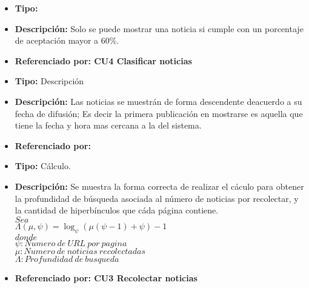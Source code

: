\begin{itemize}
  \item \textbf{Tipo:}  
  \item \textbf{Descripción:} Solo se puede mostrar una noticia si cumple con un porcentaje de aceptación mayor a 60\%.
  \item \textbf{Referenciado por: CU4 Clasificar noticias}  \\
\end{itemize}




\begin{itemize}
  \item \textbf{Tipo:} Descripción
  \item \textbf{Descripción:} Las noticias se muestrán de forma descendente deacuerdo a su fecha de difusión; Es decir la primera publicación en mostrarse es aquella que tiene la fecha y hora mas cercana a la del sistema.
  \item \textbf{Referenciado por:}  \\
\end{itemize}


\begin{itemize}
  \item \textbf{Tipo:} Cálculo.
  \item \textbf{Descripción:} Se muestra la forma correcta de realizar el cáculo para obtener la profundidad de búsqueda asociada al número de noticias por recolectar, y la cantidad de hiperbínculos que cáda página contiene.\\
 
  $Sea$\\

  $\Lambda(\mu,\psi)=\log_{\psi}{(\mu(\psi-1)+\psi)}-1$\\

  $donde$\\
  $\psi:Numero\ de\ URL\ por\ pagina$\\
  $\mu:Numero\ de\ noticias\ recolectadas$\\
  $\Lambda:Profundidad\ de\ busqueda$\\



  \item \textbf{Referenciado por: CU3 Recolectar noticias} \\
\end{itemize}

